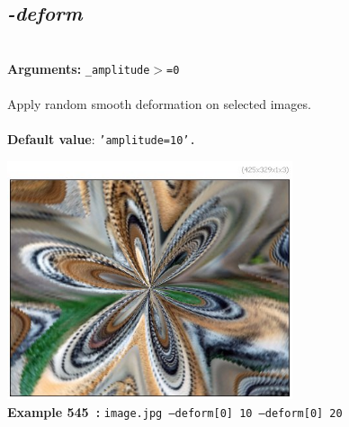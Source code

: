 \documentclass[a4paper,11pt,twoside]{book}
\begin{document}
\subsection{\emph{-deform} }\vspace*{-0.5em}
~\\\textbf{Arguments: } 
{\small \texttt{\_amplitude$>$=0}}\\~\\
Apply random smooth deformation on selected images.
~\\~\\\textbf{Default value}: {\small \texttt{'amplitude=10'.}}
\begin{center}\includegraphics[keepaspectratio=true,height=7cm,width=\textwidth]{img/gmic_def545.jpg}\\
{\footnotesize \textbf{Example 545~:} \texttt{image.jpg --deform[0] 10 --deform[0] 20}}
\end{center}
\end{document}
